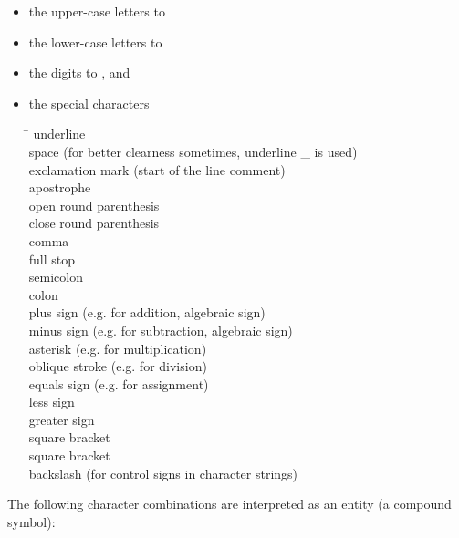 \begin{itemize}
\item the upper-case letters  to 
\item the lower-case letters  to 
\item the digits  to , and
\item the special characters
      \begin{tabbing}
      \x \=   \kill
      \code{\_} \> underline\\
\code{ }  \> space (for better clearness sometimes, underline \_ is used)\\
      \code{!}  \> exclamation mark (start of the line comment)\\
        \> apostrophe\\
      \code{(}  \> open round parenthesis\\
      \code{)}  \> close round parenthesis\\
      \code{,}  \> comma\\
        \> full stop\\
      \code{;}  \> semicolon\\
      \code{:}  \> colon\\
      \code{+}  \> plus sign (e.g. for addition, algebraic sign)\\
      \code{-}  \> minus sign (e.g. for subtraction, algebraic sign)\\
      \code{*}  \> asterisk (e.g. for multiplication)\\
      \code{/}  \> oblique stroke (e.g. for division)\\
      \code{=}  \> equals sign (e.g. for assignment)\\
      \code{<}  \> less sign\\
      \code{>}  \> greater sign\\
      \code{[}  \> square bracket\\
      \code{]}  \> square bracket\\
      \code{\textbackslash} \> backslash (for control signs in character strings)
      \end{tabbing}
\end{itemize}

The following character combinations are interpreted as an entity (a
compound symbol):

